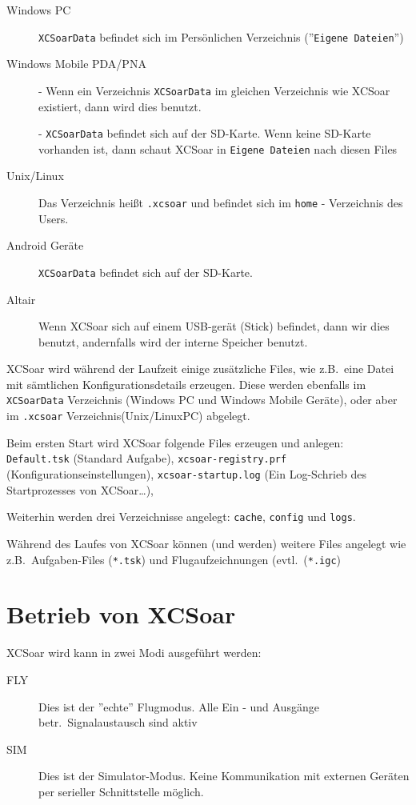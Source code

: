  
\begin{description}
\item[Windows PC]
\texttt{XCSoarData} befindet sich im Persönlichen Verzeichnis (''\texttt{Eigene Dateien}'')
\item[Windows Mobile PDA/PNA]
- Wenn ein Verzeichnis \texttt{XCSoarData} im gleichen Verzeichnis wie {\textsf  XCSoar} existiert, dann wird dies benutzt.  


- \texttt{XCSoarData} befindet sich auf der SD-Karte.  Wenn keine SD-Karte vorhanden ist, dann schaut {\textsf  XCSoar} in \texttt{Eigene Dateien} nach diesen Files

\item[Unix/Linux]
Das Verzeichnis heißt \verb|.xcsoar| und befindet sich im \verb|home| - Verzeichnis des Users. 
\item[Android Geräte]
\texttt{XCSoarData} befindet sich auf der SD-Karte.
\item[Altair]
Wenn {\textsf  XCSoar} sich auf einem USB-gerät (Stick) befindet, dann wir dies benutzt, andernfalls wird der interne Speicher benutzt. 
\end{description}


{\textsf  XCSoar} wird während der Laufzeit einige zusätzliche Files, wie z.B.\ eine Datei mit sämtlichen Konfigurationsdetails erzeugen.
Diese werden ebenfalls im \texttt{XCSoarData} Verzeichnis (Windows PC und Windows Mobile Geräte), oder aber im \texttt{.xcsoar} 
Verzeichnis(Unix/LinuxPC) abgelegt. 

Beim ersten Start wird {\textsf  XCSoar}  folgende Files erzeugen und anlegen: 
\texttt{Default.tsk} (Standard Aufgabe),  \texttt{xcsoar-registry.prf} (Konfigurationseinstellungen), \texttt{xcsoar-startup.log} 
(Ein Log-Schrieb des Startprozesses von {\textsf  XCSoar}\dots), 



Weiterhin werden drei Verzeichnisse angelegt: \texttt{cache}, \texttt{config} und \texttt{logs}.  

Während des Laufes von {\textsf  XCSoar} können (und werden) weitere Files angelegt wie z.B.\  Aufgaben-Files (\texttt{*.tsk}) 
und Flugaufzeichnungen (evtl.\ (\texttt{*.igc})


\section{Betrieb von {\textsf  XCSoar}}

{\textsf  XCSoar} wird kann in zwei Modi ausgeführt werden:
\begin{description}
\item[FLY] Dies ist der ''echte'' Flugmodus. Alle Ein - und Ausgänge betr.\ Signalaustausch sind aktiv
\item[SIM] Dies ist der Simulator-Modus. Keine Kommunikation mit externen Geräten per serieller Schnittstelle möglich. 
\end{description}


